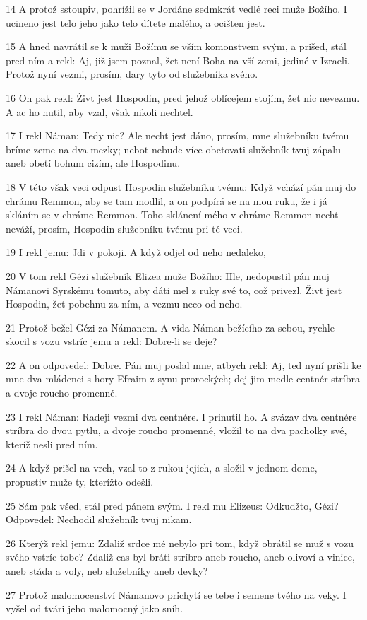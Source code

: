 \par 14 A protož sstoupiv, pohrížil se v Jordáne sedmkrát vedlé reci muže Božího. I ucineno jest telo jeho jako telo dítete malého, a ocišten jest.
\par 15 A hned navrátil se k muži Božímu se vším komonstvem svým, a prišed, stál pred ním a rekl: Aj, již jsem poznal, žet není Boha na vší zemi, jediné v Izraeli. Protož nyní vezmi, prosím, dary tyto od služebníka svého.
\par 16 On pak rekl: Živt jest Hospodin, pred jehož oblícejem stojím, žet nic nevezmu. A ac ho nutil, aby vzal, však nikoli nechtel.
\par 17 I rekl Náman: Tedy nic? Ale necht jest dáno, prosím, mne služebníku tvému bríme zeme na dva mezky; nebot nebude více obetovati služebník tvuj zápalu aneb obetí bohum cizím, ale Hospodinu.
\par 18 V této však veci odpust Hospodin služebníku tvému: Když vchází pán muj do chrámu Remmon, aby se tam modlil, a on podpírá se na mou ruku, že i já skláním se v chráme Remmon. Toho sklánení mého v chráme Remmon necht neváží, prosím, Hospodin služebníku tvému pri té veci.
\par 19 I rekl jemu: Jdi v pokoji. A když odjel od neho nedaleko,
\par 20 V tom rekl Gézi služebník Elizea muže Božího: Hle, nedopustil pán muj Námanovi Syrskému tomuto, aby dáti mel z ruky své to, což privezl. Živt jest Hospodin, žet pobehnu za ním, a vezmu neco od neho.
\par 21 Protož bežel Gézi za Námanem. A vida Náman bežícího za sebou, rychle skocil s vozu vstríc jemu a rekl: Dobre-li se deje?
\par 22 A on odpovedel: Dobre. Pán muj poslal mne, atbych rekl: Aj, ted nyní prišli ke mne dva mládenci s hory Efraim z synu prorockých; dej jim medle centnér stríbra a dvoje roucho promenné.
\par 23 I rekl Náman: Radeji vezmi dva centnére. I prinutil ho. A svázav dva centnére stríbra do dvou pytlu, a dvoje roucho promenné, vložil to na dva pacholky své, kteríž nesli pred ním.
\par 24 A když prišel na vrch, vzal to z rukou jejich, a složil v jednom dome, propustiv muže ty, kterížto odešli.
\par 25 Sám pak všed, stál pred pánem svým. I rekl mu Elizeus: Odkudžto, Gézi? Odpovedel: Nechodil služebník tvuj nikam.
\par 26 Kterýž rekl jemu: Zdaliž srdce mé nebylo pri tom, když obrátil se muž s vozu svého vstríc tobe? Zdaliž cas byl bráti stríbro aneb roucho, aneb olivoví a vinice, aneb stáda a voly, neb služebníky aneb devky?
\par 27 Protož malomocenství Námanovo prichytí se tebe i semene tvého na veky. I vyšel od tvári jeho malomocný jako sníh.

